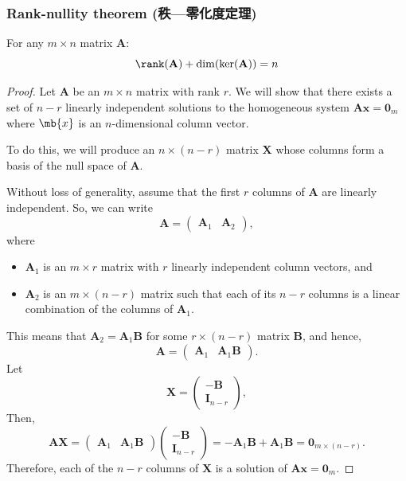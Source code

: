 \documentclass[a4paper,12pt]{report}
\begin{document}
\subsubsection{Rank-nullity theorem (秩—零化度定理)}
For any $m\times n$ matrix $\mathbf{A}$:
\[\rank(\mathbf{A})+\dim(\ker(\mathbf{A}))=n\]
\begin{proof}
Let \(\mathbf{A}\) be an \(m\times n\) matrix with rank \(r\). We will show that there exists a set of \(n-r\) linearly independent solutions to the homogeneous system \(\mathbf{Ax}=\mathbf{0}_m\) where $\mb{x}$ is an $n$-dimensional column vector.

To do this, we will produce an \(n\times(n-r)\) matrix \(\mathbf{X}\) whose columns form a basis of the null space of \(\mathbf{A}\).

Without loss of generality, assume that the first \(r\) columns of \(\mathbf{A}\) are linearly independent. So, we can write
\[\mathbf{A}=\begin{pmatrix}\mathbf{A}_1&\mathbf{A}_2\end{pmatrix},\]
where
\begin{itemize}
\item \(\mathbf{A}_1\) is an \(m \times r\) matrix with \(r\) linearly independent column vectors, and
\item \(\mathbf{A}_2\) is an \(m\times(n-r)\) matrix such that each of its \(n-r\) columns is a linear combination of the columns of \(\mathbf{A}_1\).
\end{itemize}
This means that \(\mathbf{A}_2 = \mathbf{A}_1\mathbf{B}\) for some \(r \times (n-r)\) matrix \(\mathbf{B}\), and hence,
\[\mathbf{A} = \begin{pmatrix} \mathbf{A}_1 & \mathbf{A}_1\mathbf{B}\end{pmatrix}.\]
Let
\[\mathbf{X} = \begin{pmatrix} -\mathbf{B} \\ \mathbf{I}_{n-r} \end{pmatrix},\]
Then,
\[\mathbf{A}\mathbf{X} = \begin{pmatrix}\mathbf{A}_1 & \mathbf{A}_1\mathbf{B} \end{pmatrix}\begin{pmatrix} -\mathbf{B} \\ \mathbf{I}_{n-r} \end{pmatrix} = -\mathbf{A}_1\mathbf{B} + \mathbf{A}_1\mathbf{B} = \mathbf{0}_{m \times (n-r)}.\]
Therefore, each of the \(n-r\) columns of \(\mathbf{X}\) is a solution of \(\mathbf{Ax} = \mathbf{0}_m\).


\end{proof}
\end{document}
